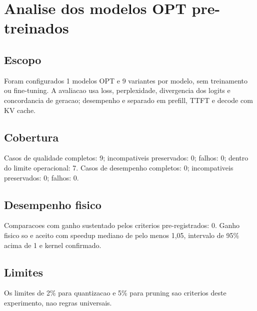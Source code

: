\chapter{Analise dos modelos OPT pre-treinados}
\section{Escopo}
Foram configurados 1 modelos OPT e 9 variantes por modelo, sem treinamento ou fine-tuning.
A avaliacao usa loss, perplexidade, divergencia dos logits e concordancia de geracao; desempenho e separado em prefill, TTFT e decode com KV cache.
\section{Cobertura}
Casos de qualidade completos: 9; incompativeis preservados: 0; falhos: 0; dentro do limite operacional: 7.
Casos de desempenho completos: 0; incompativeis preservados: 0; falhos: 0.
\section{Desempenho fisico}
Comparacoes com ganho sustentado pelos criterios pre-registrados: 0.
Ganho fisico so e aceito com speedup mediano de pelo menos 1,05, intervalo de 95\% acima de 1 e kernel confirmado.
\section{Limites}
Os limites de 2\% para quantizacao e 5\% para pruning sao criterios deste experimento, nao regras universais.
